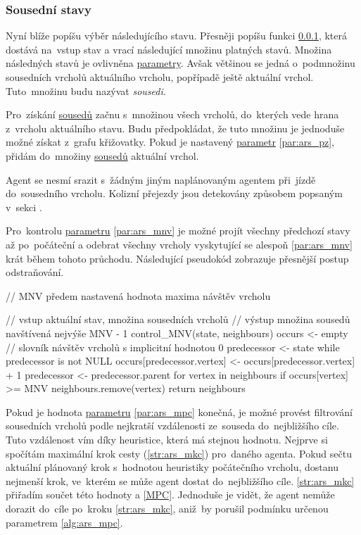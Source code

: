 \subsubsection{Sousední stavy}\label{subsubsec:sousedni_stavy}

Nyní blíže popíšu výběr následujícího stavu.
Přesněji popíšu funkci \ref{subsubsec:sousedni_stavy},
která dostává na~vstup stav a vrací následující množinu platných stavů.
Množina následných stavů je ovlivněna \hyperref[subsubsec:ars_parametry]{parametry}.
Avšak většinou se jedná o~podmnožinu sousedních vrcholů aktuálního vrcholu, popřípadě ještě aktuální vrchol.
Tuto~množinu budu nazývat \emph{sousedi}.

Pro~získání \hyperref[str:ars_sousedi]{sousedů} začnu s~množinou všech vrcholů,
do~kterých vede hrana z~vrcholu aktuálního stavu.
Budu předpokládat, že tuto množinu je jednoduše možné získat z~grafu křižovatky.
Pokud je nastavený \hyperref[subsubsec:ars_parametry]{parametr} \ref{par:ars_pz},
přidám do~množiny \hyperref[str:ars_sousedi]{sousedů} aktuální vrchol.

Agent se nesmí srazit s~žádným jiným naplánovaným agentem při~jízdě do~sousedního vrcholu.
Kolizní přejezdy jsou detekovány způsobem popsaným v~sekci .

Pro~kontrolu \hyperref[subsubsec:ars_parametry]{parametru} \ref{par:ars_mnv}
je možné projít všechny předchozí stavy až po~počáteční
a odebrat všechny vrcholy vyskytující se alespoň \ref{par:ars_mnv} krát během tohoto průchodu.
Následující pseudokód zobrazuje přesnější postup odstraňování.

\begin{code}[fontsize=\footnotesize]
// MNV předem nastavená hodnota maxima návštěv vrcholu

// vstup aktuální stav, množina sousedních vrcholů
// výstup množina sousedů navštívená nejvýše MNV - 1
control_MNV(state, neighbours)
  occurs <- empty // slovník návštěv vrcholů s implicitní hodnotou 0
  predecessor <- state
  while predecessor is not NULL
    occurs[predecessor.vertex] <- occurs[predecessor.vertex] + 1
    predecessor <- predecessor.parent
  for vertex in neighbours
    if occurs[vertex] >= MNV
      neighbours.remove(vertex)
  return neighbours
\end{code}

Pokud je hodnota \hyperref[subsubsec:ars_parametry]{parametru} \ref{par:ars_mpc} konečná,
je možné provést filtrování sousedních vrcholů podle nejkratší vzdálenosti ze~souseda do~nejbližšího cíle.
Tuto vzdálenost vím díky heuristice, která má stejnou hodnotu.
Nejprve si spočítám maximální krok cesty (\ref{str:ars_mkc}) pro~daného agenta.
Pokud sečtu aktuální plánovaný krok s~hodnotou heuristiky počátečního vrcholu, dostanu nejmenší krok,
ve~kterém se může agent dostat do~nejbližšího cíle.
\ref{str:ars_mkc} přiřadím součet této hodnoty a \ref{MPC}.
Jednoduše je vidět, že agent nemůže dorazit do~cíle po~kroku \ref{str:ars_mkc},
aniž~by porušil podmínku určenou parametrem \ref{alg:ars_mpc}.

